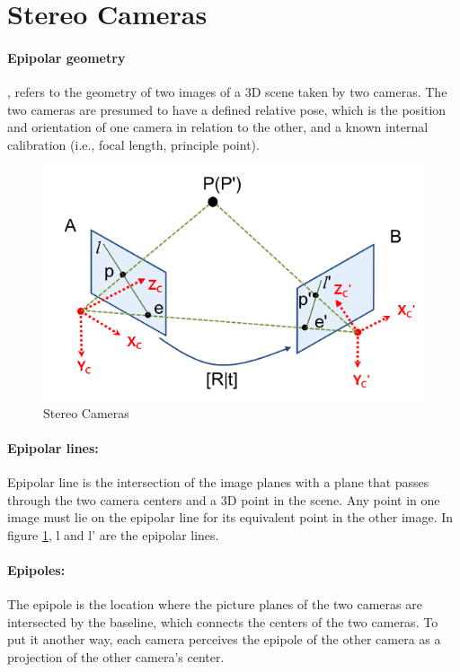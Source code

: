 \documentclass[11pt]{article}
\begin{document}
    \section{Stereo Cameras}
    \label{stereo_cameras}
    \paragraph{Epipolar geometry}, refers to the geometry of two images of a 3D scene taken
    by two cameras. The two cameras are presumed to have a defined relative pose, which is
    the position and orientation of one camera in relation to the other, and a known internal calibration
    (i.e., focal length, principle point).

    \begin{figure}
        \centering
        \includegraphics[width=\textwidth,height=\textheight,keepaspectratio]{images/epipolar_1.png}
        \caption{Stereo Cameras}
        \label{fig:stereo_cameras}
    \end{figure}


    \paragraph{Epipolar lines:} Epipolar line is the intersection of the image planes with a plane that
    passes through the two camera centers and a 3D point in the scene. Any point in one image must lie on
    the epipolar line for its equivalent point in the other image. In figure \ref{fig:stereo_cameras}, l and l' are the epipolar lines.

    \paragraph{Epipoles:} The epipole is the location where the picture planes of the two cameras are
    intersected by the baseline, which connects the centers of the two cameras. To put it another way,
    each camera perceives the epipole of the other camera as a projection of the other camera's center.
\end{document}
